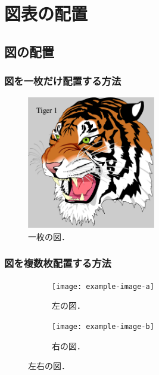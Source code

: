\chapter{図表の配置}
\label{ch:figure_table}



\section{図の配置}
\label{sec:figure}


\subsection{図を一枚だけ配置する方法}
\label{ssec:figure_sigle}

\begin{figure}
    \centering
    \includegraphics[width=0.5\textwidth]{figure/tiger1.pdf}
    \caption{一枚の図．}
    \label{fig:example}
\end{figure}


\subsection{図を複数枚配置する方法}
\label{ssec:multiple}

\begin{figure}[tp]
    \centering
    \begin{subfigure}{0.45\textwidth}
        \centering
        \texttt{[image: example-image-a]}
        \caption{左の図．}
        \label{fig:example_a}
    \end{subfigure}
    \hfill %
    \begin{subfigure}{0.45\textwidth}
        \centering
        \texttt{[image: example-image-b]}
        \caption{右の図．}
        \label{fig:example_b}
    \end{subfigure}
    \caption{左右の図．}
    \label{fig:example2}
\end{figure}


